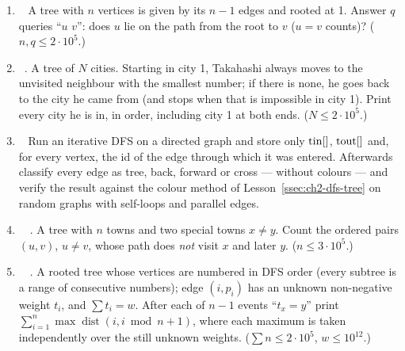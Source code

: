 \exlegend
\begin{enumerate}[leftmargin=*, label=\textbf{E3.\arabic*}, itemsep=6pt]
    \item \exeasy\ \pconcept {} A tree with $n$ vertices is given by its $n-1$ edges and rooted at 1. Answer $q$ queries ``$u$ $v$'': does $u$ lie on the path from the root to $v$ ($u = v$ counts)? ($n, q \le 2\cdot10^5$.)
    \item \exeasy\ \pclassic {}. A tree of $N$ cities. Starting in city 1, Takahashi always moves to the unvisited neighbour with the smallest number; if there is none, he goes back to the city he came from (and stops when that is impossible in city 1). Print every city he is in, in order, including city 1 at both ends. ($N \le 2\cdot10^5$.)
    \item \exmedium\ \pconcept {} Run an iterative DFS on a directed graph and store only $\mathrm{tin}[]$, $\mathrm{tout}[]$ and, for every vertex, the id of the edge through which it was entered. Afterwards classify every edge as tree, back, forward or cross --- without colours --- and verify the result against the colour method of Lesson~\ref{ssec:ch2-dfs-tree} on random graphs with self-loops and parallel edges.
    \item \exmedium\ \ptricky {}\ . A tree with $n$ towns and two special towns $x \ne y$. Count the ordered pairs $(u, v)$, $u \ne v$, whose path does \emph{not} visit $x$ and later $y$. ($n \le 3\cdot10^5$.)
    \item \exmedium\ \precent {}\ . A rooted tree whose vertices are numbered in DFS order (every subtree is a range of consecutive numbers); edge $(i, p_i)$ has an unknown non-negative weight $t_i$, and $\sum t_i = w$. After each of $n-1$ events ``$t_x = y$'' print $\sum_{i=1}^{n} \max \operatorname{dist}(i, i \bmod n + 1)$, where each maximum is taken independently over the still unknown weights. ($\sum n \le 2\cdot10^5$, $w \le 10^{12}$.)
\end{enumerate}

